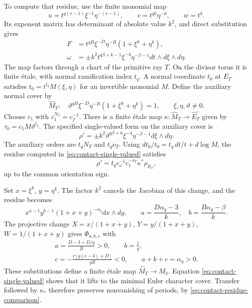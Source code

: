 \documentclass[11pt]{article}
\numberwithin{equation}{section}
\theoremstyle{definition}
\theoremstyle{remark}
\begin{document}
To compute that residue, use the finite monomial map
\begin{equation}\label{eq:finite-contact-chart}
 u=t^{q(r-1)}\xi^{-1}\eta^{-(r-1)},\qquad
 v=t^{qk}\eta^{-k},\qquad w=t^k.
\end{equation}
Its exponent matrix has determinant of absolute value $k^2$,
and direct substitution gives
\begin{equation}\label{eq:contact-leading}
 \begin{split}
 F&=t^{qB}\xi^{-D}\eta^{-B}(1+\xi^k+\eta^k),\\
 \omega&=\pm k^2t^{q\beta+k-1}\xi^{-4}\eta^{-\beta-1}
                   dt\wedge d\xi\wedge d\eta.
 \end{split}
\end{equation}
The map factors through a chart of the primitive ray $T$.
On the divisor torus it is finite \'etale, with normal
ramification index $t_q$. A normal coordinate $t_0$ at
$E_T$ satisfies $t_0=t^{t_q}M(\xi,\eta)$ for an invertible
monomial $M$. Define the auxiliary normal cover by
\begin{equation}\label{eq:contact-auxiliary-cover}
 \widehat M_T:\quad
 \vartheta^{qB}\xi^{-D}\eta^{-B}(1+\xi^k+\eta^k)=1,
 \qquad \xi,\eta,\vartheta\ne0.
\end{equation}
Choose $c_1$ with $c_1^{N_T}=c_f^{-1}$. There is a finite
\'etale map $\kappa:\widehat M_T\to\widehat E_T^\circ$
given by $\tau_0=c_1M\vartheta^{t_q}$.
The specified single-valued form on the auxiliary cover is
\begin{equation}\label{eq:contact-single-valued}
 \rho'=\pm k^2\vartheta^{q\beta+k}\xi^{-4}\eta^{-\beta-1}
                         d\xi\wedge d\eta.
\end{equation}
The auxiliary orders are $t_qN_T$ and $t_q\nu_T$.
Using
$dt_0/t_0=t_q\,dt/t+d\log M$, the residue computed in
\eqref{eq:contact-single-valued} satisfies
\begin{equation}\label{eq:contact-residue-comparison}
 \rho'=t_q c_\omega^{-1}c_1^{-\nu_T}\kappa^*\rho_{E_T},
\end{equation}
up to the common orientation sign.

Set $x=\xi^k$, $y=\eta^k$. The factor $k^2$ cancels the
Jacobian of this change, and the residue becomes
\[
 x^{a-1}y^{b-1}(1+x+y)^{-\alpha_q}dx\wedge dy,
 \qquad a=\frac{D\alpha_q-3}{k},\quad
 b=\frac{B\alpha_q-\beta}{k}.
\]
The projective change
$X=x/(1+x+y)$, $Y=y/(1+x+y)$, $W=1/(1+x+y)$ gives
$\Phi_{a,b,c}$ with
\begin{equation}\label{eq:contact-Euler}
 \begin{gathered}
 a=\frac{D-3+D/q}{B}>0,\qquad b=\frac1q,\\
 c=-\frac{r[q(e-3)+D]}{qB}<0,\qquad a+b+c=\alpha_q>0.
 \end{gathered}
\end{equation}
These substitutions define a finite \'etale map
$\widehat M_T\to M_2$. Equation
\eqref{eq:contact-single-valued} shows that it lifts to
the minimal Euler character cover. Transfer followed by
$\kappa_*$ therefore preserves nonvanishing of periods,
by \eqref{eq:contact-residue-comparison}.
\end{document}
